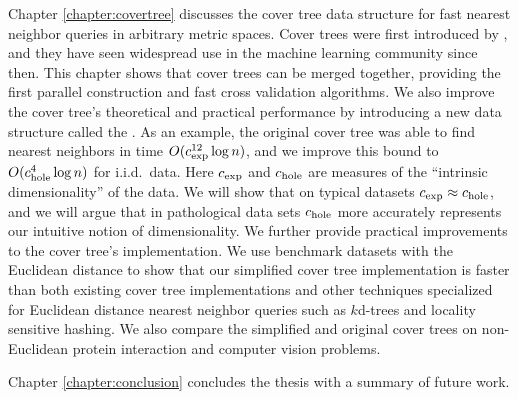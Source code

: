 \documentclass[thesis.tex]{subfiles}
\begin{document}
Chapter \ref{chapter:covertree} discusses the cover tree data structure for fast nearest neighbor queries in arbitrary metric spaces.
Cover trees were first introduced by \cite{beygelzimer2006cover},
and they have seen widespread use in the machine learning community since then.
This chapter shows that cover trees can be merged together,
providing the first parallel construction and fast cross validation algorithms.
We also improve the cover tree's theoretical and practical performance by introducing a new data structure called the .
As an example, 
the original cover tree was able to find nearest neighbors in time $O(c_\textnormal{exp}^{12}\log n)$,
and we improve this bound to $O(c_\textnormal{hole}^4\log n)$ for i.i.d.\ data.
Here $c_\textnormal{exp}$ and $c_\textnormal{hole}$ are measures of the ``intrinsic dimensionality'' of the data.
We will show that on typical datasets $c_\textnormal{exp} \approx c_\textnormal{hole}$,
and we will argue that in pathological data sets $c_\textnormal{hole}$ more accurately represents our intuitive notion of dimensionality.
We further provide practical improvements to the cover tree's implementation.
We use benchmark datasets with the Euclidean distance to show that our simplified cover tree implementation is faster than both existing cover tree implementations and other techniques specialized for Euclidean distance nearest neighbor queries such as $k$d-trees and locality sensitive hashing.
We also compare the simplified and original cover trees on non-Euclidean protein interaction and computer vision problems.

Chapter \ref{chapter:conclusion} concludes the thesis with a summary of future work.

\end{document}
